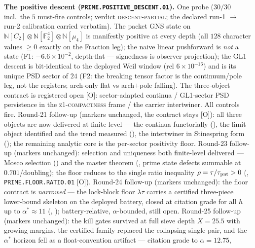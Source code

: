 \par\smallskip\noindent\textbf{The positive descent
(\texttt{PRIME.POSITIVE\_DESCENT.01}).}
One probe ($30/30$ incl.\ the $5$ must-fire controls; verdict
\textsc{descent-partial}; the declared run-1 $\to$ run-2
calibration carried verbatim).  The packet GNS state on
$\mathbb N[C_2]\otimes\mathbb N[\mathbb F_2^4]\otimes
\mathbb N[\mu_4]$ is manifestly positive at every depth (all $128$
character values $\ge0$ exactly on the Fraction leg); the naive
linear pushforward is \emph{not} a state (F1: $-6.6\times10^{-2}$,
depth-flat --- signedness is observer projection); the GL1 descent
is bit-identical to the deployed Weil window (rel
$6\times10^{-16}$) and is its unique PSD sector of $24$ (F2: the
breaking tensor factor is the continuum/pole leg, not the
registers; arch-only flat vs arch$+$pole falling).  The three-object
contract is registered open [O]: sector-adapted continua /
GL1-sector PSD persistence in the \textsc{z1-compactness} frame /
the carrier intertwiner.  All controls fire.  Round-21 follow-up
(markers unchanged, the contract stays [O]): all three objects are
now delivered at finite level --- the continua functorially
(), the limit object identified
and the trend measured (), the
intertwiner in Stinespring form
(); the remaining analytic
core is the per-sector positivity floor.  Round-23 follow-up
(markers unchanged): selection and uniqueness both finite-level
delivered --- Mosco selection
() and the master theorem
(, prime state defects
summable at $0.701$/doubling); the floor reduces to the single
ratio inequality $\rho=\tau/\tau_{\rm pnt}>0$
(,
\texttt{PRIME.FLOOR.RATIO.01} [O]).  Round-24 follow-up (markers
unchanged): the floor contract is \emph{narrowed} --- the
lock-block floor $\lambda\tau$ carries a certified three-piece
lower-bound skeleton on the deployed battery, closed at citation
grade for all $h$ up to $\alpha^*\approx11$
(,
); battery-relative,
$\alpha$-bounded, still open.  Round-25 follow-up (markers
unchanged): the kill gates survived at full sieve depth
$X = 25.5$ with growing margins, the certified family replaced
the collapsing single pair, and the $\alpha^*$ horizon fell as a
float-convention artifact --- citation grade to $\alpha = 12.75$,
